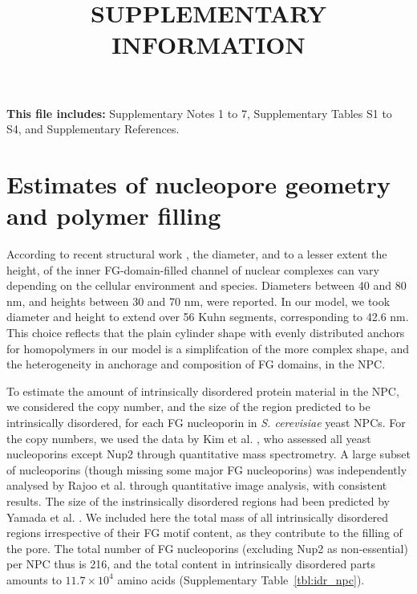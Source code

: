 \documentclass[10pt, a4paper, twocolumn]{article}
\title{SUPPLEMENTARY INFORMATION}
\author{}
\date{}
\begin{document}
\maketitle


\begin{center}
    \textbf{This file includes:} Supplementary Notes 1 to 7, Supplementary Tables S1 to S4, and Supplementary References.
\end{center}
\twocolumn


\pagebreak
\section{Estimates of nucleopore geometry and polymer filling}

According to recent structural work \cite{Zimmerli2021, Schuller2021}, the diameter, and to a lesser extent the height, of the inner FG-domain-filled channel of nuclear complexes can vary depending on the cellular environment and species.
Diameters between 40 and 80 nm, and heights between 30 and 70 nm, were reported.
In our model, we took diameter and height to extend over 56 Kuhn segments, corresponding to 42.6 nm.
This choice reflects that the plain cylinder shape with evenly distributed anchors for homopolymers in our model is a simplifcation of the more complex shape, and the heterogeneity in anchorage and composition of FG domains, in the NPC.

To estimate the amount of intrinsically disordered protein material in the NPC, we considered the copy number, and the size of the region predicted to be intrinsically disordered, for each FG nucleoporin in \textit{S. cerevisiae} yeast NPCs.
For the copy numbers, we used the data by Kim et al. \cite{Kim2018}, who assessed all yeast nucleoporins except Nup2 through quantitative mass spectrometry.
A large subset of nucleoporins (though missing some major FG nucleoporins) was independently analysed by Rajoo et al. \cite{Rajoo2018} through quantitative image analysis, with consistent results.
The size of the instrinsically disordered regions had been predicted by Yamada et al. \cite{Yamada2010}.
We included here the total mass of all intrinsically disordered regions irrespective of their FG motif content, as they contribute to the filling of the pore.
The total number of FG nucleoporins (excluding Nup2 as non-essential) per NPC thus is 216, and the total content in intrinsically disordered parts amounts to  $11.7 \times 10^4$ amino acids (Supplementary Table~\ref{tbl:idr_npc}).
\end{document}

